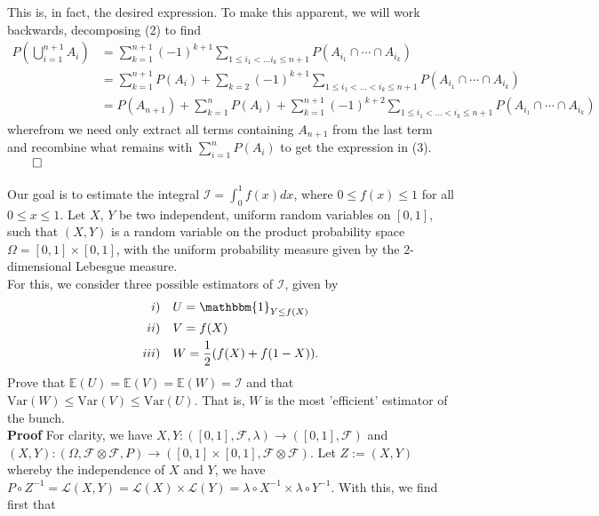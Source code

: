 \documentclass[11pt, letterpaper]{article}
\newcommand{\ex}[1]{\mathbb{E}\left(#1\right)}
\newcommand{\var}[1]{\text{Var}\left(#1\right)}
\newcommand{\mc}[1]{\mathcal{#1}}
\begin{document}
    This is, in fact, the desired expression. To make this apparent, we will work backwards, decomposing (2) to find
    \begin{align*}
        P\left(\bigcup_{i=1}^{n+1}A_i\right)&=\sum_{k=1}^{n+1}(-1)^{k+1}\sum_{1\leq i_1<\dots i_k\leq n+1}P(A_{i_1}\cap\cdots\cap A_{i_k})\\
        &=\sum_{k=1}^{n+1}P(A_i)+\sum_{k=2}(-1)^{k+1}\sum_{1\leq i_1<\dots <i_k\leq n+1}P(A_{i_1}\cap\cdots\cap A_{i_k})\\
        &=P(A_{n+1})+\sum_{k=1}^{n}P(A_i)+\sum_{k=1}^{n+1}(-1)^{k+2}\sum_{1\leq i_1<\dots <i_k\leq n+1}P(A_{i_1}\cap\cdots\cap A_{i_k})
    \end{align*}
    wherefrom we need only extract all terms containing $A_{n+1}$ from the last term and recombine what remains with $\sum_{i=1}^nP(A_i)$ to get the expression in (3).\hfill{$\qed$}\\[10pt]
    \\[10pt]
    Our goal is to estimate the integral $\mc{I}=\int_0^1f(x)dx$, where $0\leq f(x)\leq 1$ for all $0\leq x\leq 1$. Let $X$, $Y$ be two independent, uniform random variables on
    $[0,1]$, such that $(X,Y)$ is a random variable on the product probability space $\Omega=[0,1]\times[0,1]$, with the uniform probability measure given by the 2-dimensional Lebesgue measure.\\[10pt]
    For this, we consider three possible estimators of $\mc{I}$, given by
    \begin{align*}
        i)\quad & U=\mathbbm{1}_{Y\leq f(X)}\\
        ii)\quad & V=f(X)\\
        iii)\quad & W=\frac{1}{2}(f(X)+f(1-X)).
    \end{align*}
    Prove that $\ex{U}=\ex{V}=\ex{W}=\mc{I}$ and that $\var{W}\leq\var{V}\leq\var{U}$. That is, $W$ is the most 'efficient' estimator of the bunch.\\[10pt]
    {\bf Proof} For clarity, we have $X,Y:([0,1],\mc{F},\lambda)\rightarrow ([0,1],\mc{F})$ and $(X,Y):(\Omega,\mc{F}\otimes\mc{F},P)\rightarrow([0,1]\times[0,1],\mc{F}\otimes\mc{F})$. Let $Z:=(X,Y)$ whereby the independence of $X$ and $Y$, we have
    $P\circ Z^{-1}=\mc{L}(X,Y)=\mc{L}(X)\times\mc{L}(Y)=\lambda\circ X^{-1}\times\lambda\circ Y^{-1}$. With this, we find first that
\end{document}
